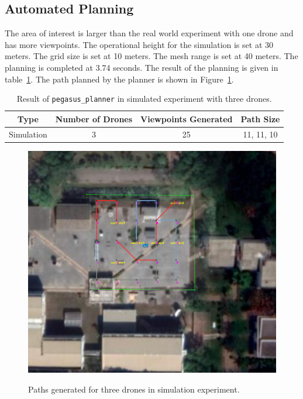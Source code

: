 \subsection{Automated Planning}
The area of interest is larger than the real world experiment with one drone and has more viewpoints. The operational height for the simulation is set at 30 meters. The grid size is set at 10 meters. The mesh range is set at 40 meters. The planning is completed at 3.74 seconds. The result of the planning is given in table~\ref{tab:simulated-planning}. The path planned by the planner is shown in Figure~\ref{fig:simulated-plan}.

\begin{table}[t]
	\caption[Result of \texttt{pegasus\_planner} in simulated experiment with three drones.]{\small Result of \texttt{pegasus\_planner} in simulated experiment with three drones.}
	\begin{center}
		\begin{tabular}{c|c|c|c}
			\hline Type & Number of Drones & Viewpoints Generated & Path Size \\ \hline \hline
			Simulation & 3 & 25 & 11, 11, 10 \\ \hline
		\end{tabular}
	\end{center}
	\label{tab:simulated-planning}
\end{table}

\begin{figure}
	\centering
	\caption[Paths generated for three drones in simulation experiment.]{\small Paths generated for three drones in simulation experiment.} 
	\includegraphics[width=5in]{figures/experiment/simulated-plan}
	\label{fig:simulated-plan}
\end{figure}

